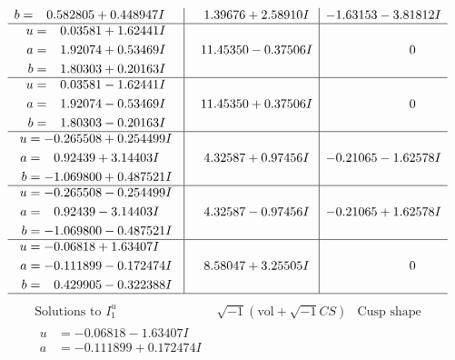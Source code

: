 \documentclass[1p]{elsarticle_modified}
\theoremstyle{definition}
\newcommand{\I}{\sqrt{-1}}
\begin{document}
$$\begin{array}{c|c|c}
\begin{aligned}
b &= \phantom{-}0.582805 + 0.448947 I\end{aligned}
 & \phantom{-}1.39676 + 2.58910 I & -1.63153 - 3.81812 I \\ \hline\begin{aligned}
u &= \phantom{-}0.03581 + 1.62441 I \\
a &= \phantom{-}1.92074 + 0.53469 I \\
b &= \phantom{-}1.80303 + 0.20163 I\end{aligned}
 & \phantom{-}11.45350 - 0.37506 I & \phantom{-0.000000 } 0 \\ \hline\begin{aligned}
u &= \phantom{-}0.03581 - 1.62441 I \\
a &= \phantom{-}1.92074 - 0.53469 I \\
b &= \phantom{-}1.80303 - 0.20163 I\end{aligned}
 & \phantom{-}11.45350 + 0.37506 I & \phantom{-0.000000 } 0 \\ \hline\begin{aligned}
u &= -0.265508 + 0.254499 I \\
a &= \phantom{-}0.92439 + 3.14403 I \\
b &= -1.069800 + 0.487521 I\end{aligned}
 & \phantom{-}4.32587 + 0.97456 I & -0.21065 - 1.62578 I \\ \hline\begin{aligned}
u &= -0.265508 - 0.254499 I \\
a &= \phantom{-}0.92439 - 3.14403 I \\
b &= -1.069800 - 0.487521 I\end{aligned}
 & \phantom{-}4.32587 - 0.97456 I & -0.21065 + 1.62578 I \\ \hline\begin{aligned}
u &= -0.06818 + 1.63407 I \\
a &= -0.111899 - 0.172474 I \\
b &= \phantom{-}0.429905 - 0.322388 I\end{aligned}
 & \phantom{-}8.58047 + 3.25505 I & \phantom{-0.000000 } 0\\
 \hline 
 \end{array}$$\newpage$$\begin{array}{c|c|c}  
\text{Solutions to }I^u_{1}& \I (\text{vol} + \sqrt{-1}CS) & \text{Cusp shape}\\
 \hline 
\begin{aligned}
u &= -0.06818 - 1.63407 I \\
a &= -0.111899 + 0.172474 I \\

\end{aligned}
\end{array}$$
\end{document}
